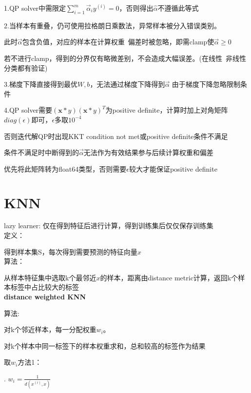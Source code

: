 \documentclass[UTF8]{ctexart}
\begin{document}
  \quad \quad 1.QP solver中需限定$\sum_{i=1}^{m}\vec{\alpha}_iy^{(i)}=0$，否则得出$\hat{\alpha}$不遵循此等式

  \quad \quad 2.当样本有重叠，仍可使用拉格朗日乘数法，异常样本被分入错误类别。

  \quad \quad \quad 此时$\vec{\alpha}$包含负值，对应的样本在计算权重\ 偏差时被忽略，即需clamp使$\vec{\alpha} \geq 0$

  \quad \quad \quad 若不进行clamp，得到的分界仅有略微差别，不会造成大幅误差。(在线性\ 非线性分类都有验证)

  \quad \quad 3.梯度下降直接得到最优$W, b$，无法通过梯度下降得到$\vec{\alpha}$ 由于梯度下降忽略限制条件

  \quad \quad 4.QP solver需要$(\mathbf{x} * y)(\mathbf{x} * y)^T$为positive definite，计算时加上对角矩阵$diag(\epsilon)$即可，$\epsilon$多取$10^{-4}$

  \quad \quad \quad 否则迭代解QP时出现KKT condition not met或positive definite条件不满足

  \quad \quad \quad 条件不满足时中断得到的$\vec{\alpha}$无法作为有效结果参与后续计算权重和偏差

  \quad \quad \quad 优先将此矩阵转为float64类型，否则需要$\epsilon$较大才能保证positive definite
  
\section{KNN}
\noindent lazy learner: 仅在得到特征后进行计算，得到训练集后仅仅保存训练集\\
  定义：

  \quad 得到样本集S，每次得到需要预测的特征向量$x$\\
  算法：

  \quad 从样本特征集中选取k个最邻近$x$的样本，距离由distance metric计算，返回k个样本标签中占比较大的标签\\
\textbf{distance weighted KNN}

  算法:

  \quad 对k个邻近样本，每一分配权重$w_i$。

  \quad 对k个样本中同一标签下的样本权重求和，总和较高的标签作为结果

  取$w_i$方法1：

  . $w_i = \frac{1}{d(x^{(i)}, x)}$
\end{document}
